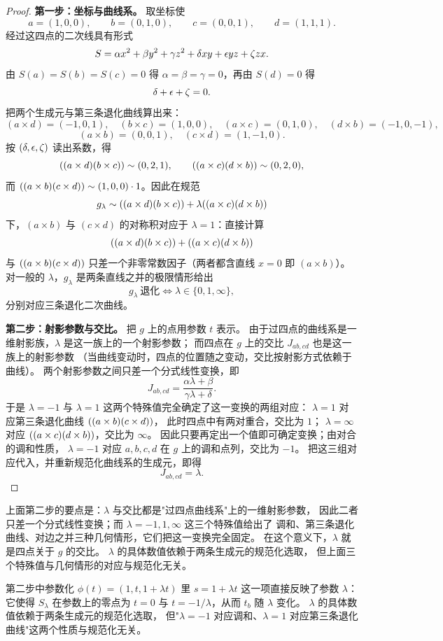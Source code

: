 \begin{proof}
\textbf{第一步：坐标与曲线系。} 取坐标使
\[
a=(1,0,0),\qquad b=(0,1,0),\qquad c=(0,0,1),\qquad d=(1,1,1).
\]
经过这四点的二次线具有形式
\[
S=\alpha x^2+\beta y^2+\gamma z^2+\delta xy+\epsilon yz+\zeta zx .
\]
由 $S(a)=S(b)=S(c)=0$ 得 $\alpha=\beta=\gamma=0$，再由 $S(d)=0$ 得
\[
\delta+\epsilon+\zeta=0 .
\]
把两个生成元与第三条退化曲线算出来：
\[
(a\times d)=(-1,0,1),\quad (b\times c)=(1,0,0),\quad
(a\times c)=(0,1,0),\quad (d\times b)=(-1,0,-1),
\]
\[
(a\times b)=(0,0,1),\quad (c\times d)=(1,-1,0).
\]
按 $(\delta,\epsilon,\zeta)$ 读出系数，得
\[
((a\times d)(b\times c))\sim(0,2,1),\qquad
((a\times c)(d\times b))\sim(0,2,0),
\]
而 $((a\times b)(c\times d))\sim(1,0,0)\cdot 1$。因此在规范
\[
g_\lambda\sim((a\times d)(b\times c))+\lambda((a\times c)(d\times b))
\]
下，$(a\times b)$ 与 $(c\times d)$ 的对称积对应于
$\lambda=1$：直接计算
\[
((a\times d)(b\times c))+((a\times c)(d\times b))
\]
与 $((a\times b)(c\times d))$ 只差一个非零常数因子（两者都含直线 $x=0$ 即 $(a\times b)$）。
对一般的 $\lambda$，$g_\lambda$ 是两条直线之并的极限情形给出
\[
g_\lambda\ \text{退化}\iff \lambda\in\{0,1,\infty\},
\]
分别对应三条退化二次曲线。

\textbf{第二步：射影参数与交比。} 把 $g$ 上的点用参数 $t$ 表示。
由于过四点的曲线系是一维射影族，$\lambda$ 是这一族上的一个射影参数；
而四点在 $g$ 上的交比 $J_{ab,cd}$ 也是这一族上的射影参数
（当曲线变动时，四点的位置随之变动，交比按射影方式依赖于曲线）。
两个射影参数之间只差一个分式线性变换，即
\[
J_{ab,cd}=\frac{\alpha\lambda+\beta}{\gamma\lambda+\delta} .
\]
于是 $\lambda=-1$ 与 $\lambda=1$ 这两个特殊值完全确定了这一变换的两组对应：
$\lambda=1$ 对应第三条退化曲线 $((a\times b)(c\times d))$，
此时四点中有两对重合，交比为 $1$；
$\lambda=\infty$ 对应 $((a\times c)(d\times b))$，交比为 $\infty$。
因此只要再定出一个值即可确定变换；由对合的调和性质，
$\lambda=-1$ 对应 $a,b,c,d$ 在 $g$ 上的调和点列，交比为 $-1$。
把这三组对应代入，并重新规范化曲线系的生成元，即得
\[
J_{ab,cd}=\lambda .
\]
\end{proof}

\begin{remark}
上面第二步的要点是：$\lambda$ 与交比都是"过四点曲线系"上的一维射影参数，
因此二者只差一个分式线性变换；而 $\lambda=-1,1,\infty$ 这三个特殊值给出了
调和、第三条退化曲线、对边之并三种几何情形，它们把这一变换完全固定。
在这个意义下，$\lambda$ 就是四点关于 $g$ 的交比。
$\lambda$ 的具体数值依赖于两条生成元的规范化选取，
但上面三个特殊值与几何情形的对应与规范化无关。
\end{remark}

\begin{remark}
第二步中参数化 $\phi(t)=(1,t,1+\lambda t)$ 里 $s=1+\lambda t$ 这一项直接反映了参数 $\lambda$：
它使得 $S_\lambda$ 在参数上的零点为 $t=0$ 与 $t=-1/\lambda$，从而 $t_b$ 随 $\lambda$ 变化。
$\lambda$ 的具体数值依赖于两条生成元的规范化选取，
但"$\lambda=-1$ 对应调和、$\lambda=1$ 对应第三条退化曲线"这两个性质与规范化无关。
\end{remark}
